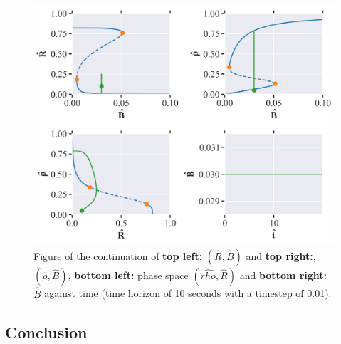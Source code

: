 \begin{figure}[H]
    \centering
    \includegraphics[width= \textwidth]{figures/cell_biology_R0=0.3_rho0=0.16_deltaR=1_n=4_Bmax=0.04_eps=0.0.png}
    \caption{Figure of the continuation of \textbf{top left:} $(\hat{R}, \hat{B})$ and \textbf{top right:}, $(\hat{\rho}, \hat{B})$, \textbf{bottom left:} phase space $(\hat{rho}, \hat{R})$ and 
    \textbf{bottom right:} $\hat{B}$ against time (time horizon of 10 seconds with a timestep of 0.01).}
    \label{fig:cell_biology_ex1}
\end{figure}

\subsection{Conclusion}
